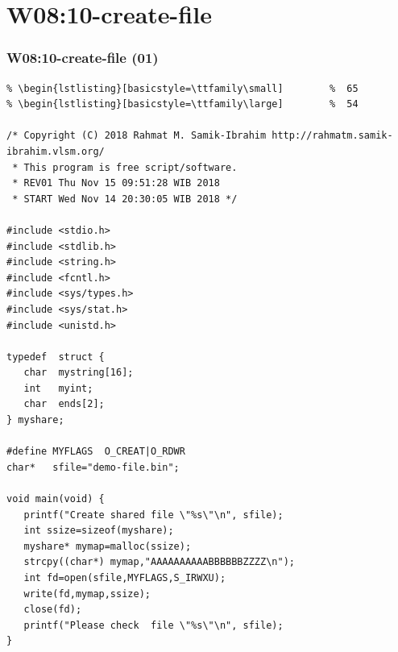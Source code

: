 \documentclass[aspectratio=169, xcolor=table, notheorems, hyperref={pdfpagelabels=false}]{beamer}
\begin{document}
\section {W08:10-create-file}
\begin{frame}[fragile]
\frametitle{W08:10-create-file (01)}
\begin{lstlisting}[basicstyle=\ttfamily\tiny]         % 108
% \begin{lstlisting}[basicstyle=\ttfamily\footnotesize] %  72
% \begin{lstlisting}[basicstyle=\ttfamily\small]        %  65
% \begin{lstlisting}[basicstyle=\ttfamily\large]        %  54

/* Copyright (C) 2018 Rahmat M. Samik-Ibrahim http://rahmatm.samik-ibrahim.vlsm.org/
 * This program is free script/software.
 * REV01 Thu Nov 15 09:51:28 WIB 2018
 * START Wed Nov 14 20:30:05 WIB 2018 */

#include <stdio.h>
#include <stdlib.h>
#include <string.h>
#include <fcntl.h>
#include <sys/types.h>
#include <sys/stat.h>
#include <unistd.h>

typedef  struct {
   char  mystring[16];
   int   myint;
   char  ends[2];
} myshare;

#define MYFLAGS  O_CREAT|O_RDWR
char*   sfile="demo-file.bin";

void main(void) {
   printf("Create shared file \"%s\"\n", sfile);
   int ssize=sizeof(myshare);
   myshare* mymap=malloc(ssize);
   strcpy((char*) mymap,"AAAAAAAAAABBBBBBZZZZ\n");
   int fd=open(sfile,MYFLAGS,S_IRWXU);
   write(fd,mymap,ssize);
   close(fd);
   printf("Please check  file \"%s\"\n", sfile);
}

\end{lstlisting}
\end{frame}
\end{document}
